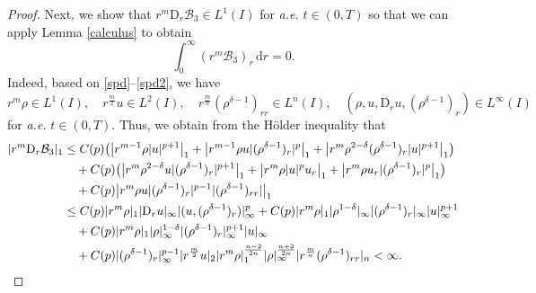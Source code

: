 \documentclass[11pt,reqno]{amsart}
\numberwithin{rk}{section}
\numberwithin{prop}{section}
\numberwithin{mydef}{section}
\numberwithin{lem}{section}
\numberwithin{equation}{section}
\numberwithin{thm}{section}
\begin{document}
\begin{proof}
Next, we show that $r^m\mathrm{D}_r  \mathcal{B}_3 \in L^1(I)$ for \textit{a.e.} $t\in (0,T)$ so that we can apply Lemma \ref{calculus} 
to obtain
\begin{equation}\label{int-B3}
\int_0^\infty (r^m\mathcal{B}_3)_r\,\mathrm{d}r =0.
\end{equation}
Indeed, based on \eqref{spd}--\eqref{spd2}, we have 
\begin{equation*}
r^m\rho\in L^1(I),\quad r^\frac{m}{2} u \in L^2(I),\quad r^\frac{m}{n} (\rho^{\delta-1})_{rr} \in L^n(I),
\quad (\rho,u,\mathrm{D}_r u,(\rho^{\delta-1})_r)\in L^\infty(I)
\end{equation*} 
for {\it a.e.} $t\in (0,T)$. Thus, we obtain from the H\"older inequality that 
\begin{align*}
&\begin{aligned}
|r^m \mathrm{D}_r \mathcal{B}_3|_1&\leq C(p)\big(\big|r^{m-1}\rho |u|^{p+1}\big|_1+\big|r^{m-1}\rho u|(\rho^{\delta-1})_r|^p\big|_1+\big|r^{m}\rho^{2-\delta}(\rho^{\delta-1})_r |u|^{p+1}\big|_1\big)\\
&\quad+C(p)\big(\big|r^{m}\rho^{2-\delta} u|(\rho^{\delta-1})_r|^{p+1}\big|_1+\big|r^{m}\rho |u|^pu_r\big|_1+\big|r^{m}\rho u_r|(\rho^{\delta-1})_r|^p\big|_1\big)\\
&\quad +C(p)\big|r^{m}\rho u|(\rho^{\delta-1})_r|^{p-1}|(\rho^{\delta-1})_{rr}|\big|_1
\end{aligned}\\
&\qquad \quad \quad \hspace{2mm} \begin{aligned}
&\leq C(p)|r^m\rho|_1 |\mathrm{D}_r u|_\infty  |(u,(\rho^{\delta-1})_r)|_\infty^p +C(p)|r^m\rho|_1|\rho^{1-\delta}|_\infty|(\rho^{\delta-1})_r|_\infty|u|_\infty^{p+1}\\
&\quad+C(p)|r^m\rho|_1 |\rho|_\infty^{1-\delta} |(\rho^{\delta-1})_r|_\infty^{p+1}|u|_\infty \\
&\quad +C(p)|(\rho^{\delta-1})_r|_\infty^{p-1}|r^\frac{m}{2}u|_2|r^m\rho|_{1}^\frac{n-2}{2n}|\rho|_{\infty}^\frac{n+2}{2n}|r^\frac{m}{n}(\rho^{\delta-1})_{rr}|_n <\infty.
\end{aligned}
\end{align*}
 



\end{proof}
\end{document}
